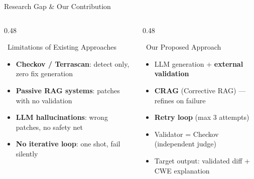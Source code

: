 \documentclass[aspectratio=169, 10pt]{beamer}
\begin{document}
\begin{frame}{Research Gap \& Our Contribution}
  \begin{columns}[T]
    \begin{column}{0.48\textwidth}
      \begin{alertblock}{\faTimesCircle\ Limitations of Existing Approaches}
        \begin{itemize}
          \item \textbf{Checkov / Terrascan}: detect only, zero fix generation
          \item \textbf{Passive RAG systems}: patches with no validation
          \item \textbf{LLM hallucinations}: wrong patches, no safety net
          \item \textbf{No iterative loop}: one shot, fail silently
        \end{itemize}
      \end{alertblock}
      \vspace{0.5em}
      \begin{center}
      \end{center}
    \end{column}
    \begin{column}{0.48\textwidth}
      \begin{exampleblock}{\faLightbulb\ Our Proposed Approach}
        \begin{itemize}
          \item LLM generation + \textbf{external validation}
          \item \textbf{CRAG} (Corrective RAG) --- refines on failure
          \item \textbf{Retry loop} (max 3 attempts)
          \item Validator = Checkov (independent judge)
          \item Target output: validated diff + CWE explanation
        \end{itemize}

\end{exampleblock}
\end{column}
\end{columns}
\end{frame}
\end{document}
